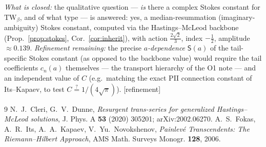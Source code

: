 \documentclass[11pt,reqno]{amsart}
\theoremstyle{plain}\newtheorem{proposition}{Proposition}\newtheorem{corollary}[proposition]{Corollary}
\theoremstyle{remark}\newtheorem{remark}[proposition]{Remark}
\newcommand{\gap}{{\footnotesize\textsf{[refinement]}}}
\begin{document}
\emph{What is closed:} the qualitative question --- \emph{is} there a complex Stokes constant for
$\mathrm{TW}_\beta$, and of what type --- is answered: yes, a median-resummation (imaginary-ambiguity)
Stokes constant, computed via the Hastings--McLeod backbone (Prop.~\ref{prop:stokes},
Cor.~\ref{cor:inherit}), with action $\tfrac{2\sqrt2}{3}$, index $-\tfrac12$, amplitude
$\approx0.139$.
\emph{Refinement remaining:} the precise \emph{$a$-dependence} $\mathsf S(a)$ of the tail-specific
Stokes constant (as opposed to the backbone value) would require the tail coefficients $c_n(a)$
themselves --- the transport hierarchy of the O1 note --- and an independent value of $C$ (e.g.\
matching the exact PII connection constant of Its--Kapaev, to test $C\stackrel?=1/(4\sqrt\pi)$).
\gap

\begin{thebibliography}{9}
 N.~J.~Cleri, G.~V.~Dunne, \emph{Resurgent trans-series for generalized
Hastings--McLeod solutions}, J. Phys. A \textbf{53} (2020) 305201; arXiv:2002.06270.
\bibitem{FIKN} A.~S.~Fokas, A.~R.~Its, A.~A.~Kapaev, V.~Yu.~Novokshenov, \emph{Painlev\'e
Transcendents: The Riemann--Hilbert Approach}, AMS Math. Surveys Monogr. \textbf{128}, 2006.
\end{thebibliography}
\end{document}
